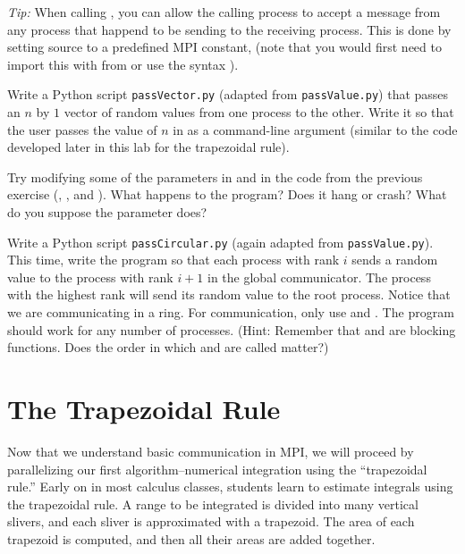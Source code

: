 
  \emph{Tip:}
  When calling , you can allow the calling process to accept a message from any process that happend to be sending to the receiving process. This is done by setting source to a predefined MPI constant,  (note that you would first need to import this with from  or use the syntax ).



  \begin{problem}
    Write a Python script \texttt{passVector.py} (adapted from \texttt{passValue.py}) that passes an $n$ by $1$ vector of random values from one process to the other. Write it so that the user passes the value of $n$ in as a command-line argument (similar to the code developed later in this lab for the trapezoidal rule).
  \end{problem}

  \begin{problem}
    Try modifying some of the parameters in  and  in the code from the previous exercise (, , and ).  What happens to the program? Does it hang or crash? What do you suppose the  parameter does?
  \end{problem}

  \begin{problem}
    Write a Python script \texttt{passCircular.py} (again adapted from \texttt{passValue.py}). This time, write the program so that each process with rank $i$ sends a random value to the process with rank $i+1$ in the global communicator. The process with the highest rank will send its random value to the root process. Notice that we are communicating in a ring. For communication, only use  and . The program should work for any number of processes. (Hint: Remember that  and  are blocking functions. Does the order in which  and  are called matter?)
  \end{problem}



\section*{The Trapezoidal Rule}
  Now that we understand basic communication in MPI, we will proceed by parallelizing our first algorithm--numerical integration using the ``trapezoidal rule.'' Early on in most calculus classes, students learn to estimate integrals using the trapezoidal rule. A range to be integrated is divided into many vertical slivers, and each sliver is approximated with a trapezoid. The area of each trapezoid is computed, and then all their areas are added together.

